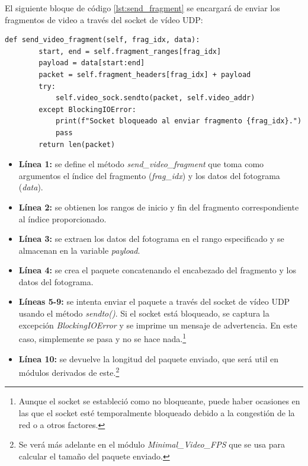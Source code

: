 El siguiente bloque de código \ref{lst:send_fragment} se encargará de enviar los fragmentos de video a través del socket de vídeo UDP:
\begin{lstlisting}[style=pythonstyle, caption={Método send\_video\_fragment() de \textit{Minimal\_Video}}, label={lst:send_fragment}]
def send_video_fragment(self, frag_idx, data):
        start, end = self.fragment_ranges[frag_idx]
        payload = data[start:end]
        packet = self.fragment_headers[frag_idx] + payload
        try:
            self.video_sock.sendto(packet, self.video_addr)
        except BlockingIOError:
            print(f"Socket bloqueado al enviar fragmento {frag_idx}.")
            pass
        return len(packet)
\end{lstlisting}

\begin{itemize}
    \item \textbf{Línea 1:} se define el método \textit{send\_video\_fragment} que toma como argumentos el índice del fragmento (\textit{frag\_idx}) y los datos del fotograma (\textit{data}).
    \item \textbf{Línea 2:} se obtienen los rangos de inicio y fin del fragmento correspondiente al índice proporcionado.
    \item \textbf{Línea 3:} se extraen los datos del fotograma en el rango especificado y se almacenan en la variable \textit{payload}.
    \item \textbf{Línea 4:} se crea el paquete concatenando el encabezado del fragmento y los datos del fotograma.
    \item \textbf{Líneas 5-9:} se intenta enviar el paquete a través del socket de vídeo UDP usando el método \textit{sendto()}. Si el socket está bloqueado, se captura la excepción \textit{BlockingIOError} y se imprime un mensaje de advertencia. En este caso, simplemente se pasa y no se hace nada.\footnote{Aunque el socket se estableció como no bloqueante, puede haber ocasiones en las que el socket esté temporalmente bloqueado debido a la congestión de la red o a otros factores.}
    \item \textbf{Línea 10:} se devuelve la longitud del paquete enviado, que será util en módulos derivados de este.\footnote{Se verá más adelante en el módulo \textit{Minimal\_Video\_FPS} que se usa para calcular el tamaño del paquete enviado.}
\end{itemize}
\vspace{\baselineskip}

